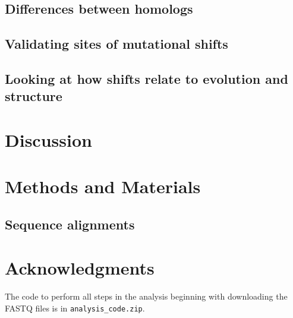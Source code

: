 \documentclass[9pt,lineno]{elife}
\begin{document}
\subsection*{Differences between homologs}


\subsection*{Validating sites of mutational shifts}

\subsection*{Looking at how shifts relate to evolution and structure}


\section{Discussion}


\section{Methods and Materials}

\subsection*{Sequence alignments}

\section{Acknowledgments}



\begin{suppfile}
\caption{
\label{suppfile:code}
The code to perform all steps in the analysis beginning with downloading the FASTQ files is in \texttt{analysis\_code.zip}.}
\end{suppfile}
\end{document}
